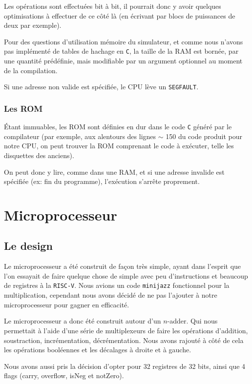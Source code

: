 \documentclass[10pt,a4paper,notitlepage ]{article}
\begin{document}
	Les opérations sont effectuées bit à bit, il pourrait donc y avoir quelques optimisations à effectuer de ce côté là (en écrivant par blocs de puissances de deux par exemple).
	
	Pour des questions d'utilisation mémoire du simulateur, et comme nous n'avons pas implémenté de tables de hachage en \texttt{C}, la taille de la RAM est bornée, par une quantité prédéfinie, mais modifiable par un argument optionnel au moment de la compilation.
	
	Si une adresse non valide est spécifiée, le CPU lève un \texttt{SEGFAULT}.
	
	\subsubsection{Les ROM}
	
	Étant immuables, les ROM sont définies en dur dans le code \texttt{C} généré par le compilateur (par exemple, aux alentours des lignes  $\sim$ 150 du code produit pour notre CPU, on peut trouver la ROM comprenant le code à exécuter, telle les disquettes des anciens).
	
	On peut donc y lire, comme dans une RAM, et si une adresse invalide est spécifiée (ex: fin du programme), l'exécution s'arrête proprement.
	
	
	\section{Microprocesseur}

		\subsection{Le design}

		Le microprocesseur a été construit de façon très simple, ayant dans l'esprit que l'on essayait de faire quelque chose de simple avec peu d'instructions et beaucoup de registres à la \texttt{RISC-V}. Nous avions un code \texttt{minijazz} fonctionnel pour la multiplication, cependant nous avons décidé de ne pas l'ajouter à notre microprocesseur pour gagner en efficacité.

		Le microprocesseur a donc été construit autour d'un $n$-adder. Qui nous permettait à l'aide d'une série de multiplexeurs de faire les opérations d'addition, soustraction, incrémentation, décrémentation. Nous avons rajouté à côté de cela les opérations booléennes et les décalages à droite et à gauche.

		Nous avons aussi pris la décision d'opter pour 32 registres de 32 bits, ainsi que 4 flags (carry, overflow, isNeg et notZero).
\end{document}
